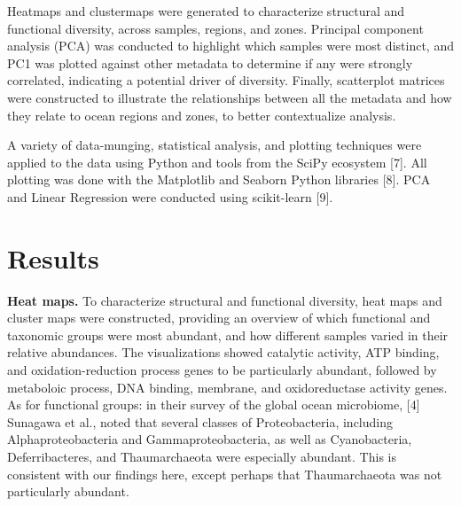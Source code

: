 \documentclass[12pt,a4paper,]{article}
\begin{document}
Heatmaps and clustermaps were generated to characterize structural and
functional diversity, across samples, regions, and zones. Principal
component analysis (PCA) was conducted to highlight which samples were
most distinct, and PC1 was plotted against other metadata to determine
if any were strongly correlated, indicating a potential driver of
diversity. Finally, scatterplot matrices were constructed to illustrate
the relationships between all the metadata and how they relate to ocean
regions and zones, to better contextualize analysis.

A variety of data-munging, statistical analysis, and plotting techniques
were applied to the data using Python and tools from the SciPy ecosystem
{[}7{]}. All plotting was done with the Matplotlib and Seaborn Python
libraries {[}8{]}. PCA and Linear Regression were conducted using
scikit-learn {[}9{]}.

\section{Results}\label{results}

\textbf{Heat maps.} To characterize structural and functional diversity,
heat maps and cluster maps were constructed, providing an overview of
which functional and taxonomic groups were most abundant, and how
different samples varied in their relative abundances. The
visualizations showed catalytic activity, ATP binding, and
oxidation-reduction process genes to be particularly abundant, followed
by metaboloic process, DNA binding, membrane, and oxidoreductase
activity genes. As for functional groups: in their survey of the global
ocean microbiome, {[}4{]} Sunagawa et al., noted that several classes of
Proteobacteria, including Alphaproteobacteria and Gammaproteobacteria,
as well as Cyanobacteria, Deferribacteres, and Thaumarchaeota were
especially abundant. This is consistent with our findings here, except
perhaps that Thaumarchaeota was not particularly abundant.
\end{document}
